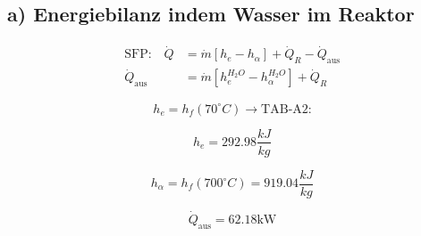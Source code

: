 \subsection*{a) Energiebilanz indem Wasser im Reaktor}

\begin{align*}
\text{SFP:} \quad \dot{Q} &= \dot{m} \left[ h_e - h_\alpha \right] + \dot{Q}_R - \dot{Q}_{\text{aus}} \\
\dot{Q}_{\text{aus}} &= \dot{m} \left[ h_e^{H_2O} - h_\alpha^{H_2O} \right] + \dot{Q}_R
\end{align*}

\[
h_e = h_f(70^\circ C) \rightarrow \text{TAB-A2:}
\]

\[
h_e = 292.98 \frac{kJ}{kg}
\]

\[
h_\alpha = h_f(700^\circ C) = 919.04 \frac{kJ}{kg}
\]

\[
\dot{Q}_{\text{aus}} = 62.18 \text{kW}
\]